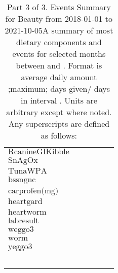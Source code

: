 \begin{table}[H]
\begin{tabular}{|l|r|r|r|r|r|}
$\textrm{RcanineGIKibble}$&&&&&\\
$\textrm{SnAgOx}$&&&&&\\
$\textrm{TunaWPA}$&&&&&\\
$\textrm{bssngnc}$&&&&&\\
$\textrm{carprofen(mg)}$&&&&&\\
$\textrm{heartgard}$&&&&&\\
$\textrm{heartworm}$&&&&&\\
$\textrm{labresult}$&&&&&\\
$\textrm{weggo3}$&&&&&\\
$\textrm{worm}$&&&&&\\
$\textrm{yeggo3}$&&&&&\\
&&&&&\\
&&&&&\\
&&&&&\\
&&&&&\\
&&&&&\\
\hline
\end{tabular}
\caption{Part 3 of 3.  Events Summary for Beauty   from 2018-01-01 to 2021-10-05A summary of most dietary components and events  for selected months between \mjmdatemin and \mjmdatemax. Format is average daily amount ;maximum; days given/ days in interval . Units are arbitrary except where noted. Any  superscripts are defined as follows:  \mjmsuperscripts}
\end{table}
